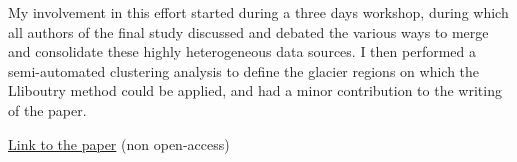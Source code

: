 My involvement in this effort started during a three days workshop, during which all authors
of the final study discussed and debated the various ways to merge and consolidate these highly heterogeneous
data sources. I then performed a semi-automated clustering analysis to define the glacier regions
on which the Lliboutry method could be applied, and had a minor contribution to the writing of the
paper.

\href{https://doi.org/10.1038/s41586-019-1071-0}{Link to the paper} (non open-access)

%


